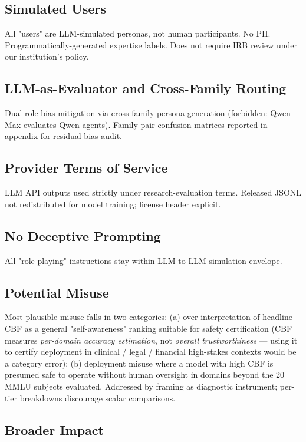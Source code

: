 \documentclass[11pt]{article}
\begin{document}
\subsection*{Simulated Users}
All "users" are LLM-simulated personas, not human participants. No PII. Programmatically-generated expertise labels. Does not require IRB review under our institution's policy.

\subsection*{LLM-as-Evaluator and Cross-Family Routing}
Dual-role bias mitigation via cross-family persona-generation (forbidden: Qwen-Max evaluates Qwen agents). Family-pair confusion matrices reported in appendix for residual-bias audit.

\subsection*{Provider Terms of Service}
LLM API outputs used strictly under research-evaluation terms. Released JSONL not redistributed for model training; license header explicit.

\subsection*{No Deceptive Prompting}
All "role-playing" instructions stay within LLM-to-LLM simulation envelope.

\subsection*{Potential Misuse}
Most plausible misuse falls in two categories: (a) over-interpretation of headline CBF as a general "self-awareness" ranking suitable for safety certification (CBF measures \emph{per-domain accuracy estimation}, not \emph{overall trustworthiness} — using it to certify deployment in clinical / legal / financial high-stakes contexts would be a category error); (b) deployment misuse where a model with high CBF is presumed safe to operate without human oversight in domains beyond the 20 MMLU subjects evaluated. Addressed by framing as diagnostic instrument; per-tier breakdowns discourage scalar comparisons.


\subsection{Broader Impact}
\end{document}
